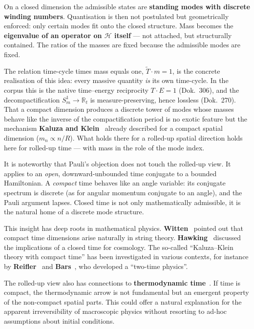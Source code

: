 \documentclass[11pt,a4paper]{article}
\begin{document}
On a closed dimension the admissible states are \textbf{standing modes with discrete winding numbers}. Quantisation is then not postulated but geometrically enforced: only certain modes fit onto the closed structure. Mass becomes the \textbf{eigenvalue of an operator on $\mathcal{H}$ itself} --- not attached, but structurally contained. The ratios of the masses are fixed because the admissible modes are fixed.

The relation time-cycle times mass equals one, $\tilde{T}\cdot m = 1$, is the concrete realisation of this idea: every massive quantity \emph{is} its own time-cycle. In the corpus this is the native time--energy reciprocity $T\cdot E = 1$ (Dok.~306), and the decompactification $S^1_m\to\mathbb{R}_t$ is measure-preserving, hence lossless (Dok.~270). That a compact dimension produces a discrete tower of modes whose masses behave like the inverse of the compactification period is no exotic feature but the mechanism \textbf{Kaluza and Klein}~\cite{Kaluza1921,Klein1926} already described for a compact spatial dimension ($m_n \propto n/R$). What holds there for a rolled-up spatial direction holds here for rolled-up time --- with mass in the role of the mode index.

It is noteworthy that Pauli's objection does not touch the rolled-up view. It applies to an \emph{open}, downward-unbounded time conjugate to a bounded Hamiltonian. A \emph{compact} time behaves like an angle variable: its conjugate spectrum is discrete (as for angular momentum conjugate to an angle), and the Pauli argument lapses. Closed time is not only mathematically admissible, it is the natural home of a discrete mode structure.

This insight has deep roots in mathematical physics. \textbf{Witten}~\cite{Witten1983} pointed out that compact time dimensions arise naturally in string theory. \textbf{Hawking}~\cite{Hawking1984} discussed the implications of a closed time for cosmology. The so-called ``Kaluza--Klein theory with compact time'' has been investigated in various contexts, for instance by \textbf{Reifler}~\cite{Reifler1992} and \textbf{Bars}~\cite{Bars1997,Bars2012}, who developed a ``two-time physics''.

The rolled-up view also has connections to \textbf{thermodynamic time}~\cite{ConnesRovelli1994}. If time is compact, the thermodynamic arrow is not fundamental but an emergent property of the non-compact spatial parts. This could offer a natural explanation for the apparent irreversibility of macroscopic physics without resorting to ad-hoc assumptions about initial conditions.
\end{document}
